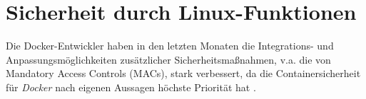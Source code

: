 \documentclass[../main.tex]{subfiles}
\begin{document}









\chapter{Sicherheit durch Linux-Funktionen}
\label{secLinux}
	Die Docker-Entwickler haben in den letzten Monaten die Integrations- und Anpassungsmöglichkeiten zusätzlicher Sicherheitsmaßnahmen, v.a. die von Mandatory Access Controls (MACs), stark verbessert, da die Containersicherheit für \emph{Docker} nach eigenen Aussagen höchste Priorität hat \cite{githubDockerRoadmap}\cite{githubDockerChangelog}.
\end{document}
